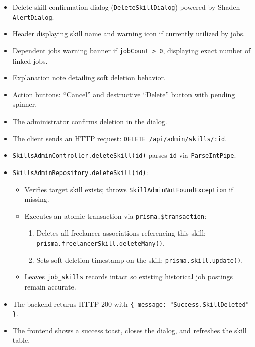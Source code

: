 \begin{itemize}[leftmargin=1.6em,topsep=3pt,itemsep=2pt,parsep=0pt,label=$\bullet$]
    \item Delete skill confirmation dialog (\texttt{DeleteSkillDialog}) powered by Shadcn \texttt{AlertDialog}.
    \item Header displaying skill name and warning icon if currently utilized by jobs.
    \item Dependent jobs warning banner if \texttt{jobCount > 0}, displaying exact number of linked jobs.
    \item Explanation note detailing soft deletion behavior.
    \item Action buttons: ``Cancel'' and destructive ``Delete'' button with pending spinner.
\end{itemize}

\begin{itemize}[leftmargin=1.6em,topsep=3pt,itemsep=2pt,parsep=0pt,label=$\bullet$]
    \item The administrator confirms deletion in the dialog.
    \item The client sends an HTTP request: \texttt{DELETE /api/admin/skills/:id}.
    \item \texttt{SkillsAdminController.deleteSkill(id)} parses \texttt{id} via \texttt{ParseIntPipe}.
    \item \texttt{SkillsAdminRepository.deleteSkill(id)}:
        \begin{itemize}[leftmargin=1.6em,topsep=2pt,itemsep=2pt,parsep=0pt]
            \item Verifies target skill exists; throws \texttt{SkillAdmin\-Not\-Found\-Exception} if missing.
            \item Executes an atomic transaction via \texttt{prisma.\$transaction}:
                \begin{enumerate}
                    \item Deletes all freelancer associations referencing this skill: \texttt{prisma.\allowbreak{}freelancer\allowbreak{}Skill.\allowbreak{}deleteMany()}.
                    \item Sets soft-deletion timestamp on the skill: \texttt{prisma.\allowbreak{}skill.\allowbreak{}update()}.
                \end{enumerate}
            \item Leaves \texttt{job\_skills} records intact so existing historical job postings remain accurate.
        \end{itemize}
    \item The backend returns HTTP 200 with \texttt{\{ message: "Success.SkillDeleted" \}}.
    \item The frontend shows a success toast, closes the dialog, and refreshes the skill table.
\end{itemize}

